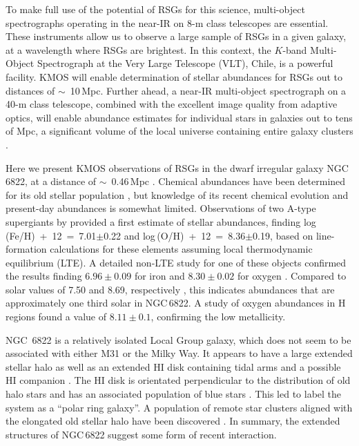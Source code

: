 To make full use of the potential of RSGs for this science, multi-object spectrographs operating in the near-IR on 8-m class telescopes are essential.
These instruments allow us to observe a large sample of RSGs in a given galaxy, at a wavelength where RSGs are brightest.
In this context, the $K$-band Multi-Object Spectrograph
\citep[KMOS;][]{2013Msngr.151...21S} at the Very Large Telescope (VLT), Chile, is a powerful facility.
KMOS will enable determination of stellar abundances for RSGs out to distances of $\sim$~10\,Mpc.
Further ahead, a near-IR multi-object spectrograph on a 40-m class telescope, combined with the excellent image quality from adaptive optics,
will enable abundance estimates for individual stars in galaxies out to tens of Mpc,
a significant volume of the local universe containing entire galaxy clusters
\citep{2011A&A...527A..50E}.

Here we present KMOS observations of RSGs in the dwarf irregular galaxy NGC\,6822,
at a distance of $\sim$~0.46\,Mpc
\citep[][and references therein]{2012AJ....144....4M}.
Chemical abundances have been determined for its old stellar population
\citep[e.g.][]{2001MNRAS.327..918T,2013ApJ...779..102K},
but knowledge of its recent chemical evolution and present-day abundances is
somewhat limited.
Observations of two A-type supergiants by
\cite{2001ApJ...547..765V} provided a first estimate of stellar abundances, finding
log\,(Fe/H)~+~12~=~7.01$\pm$0.22 and
log\,(O/H)~+~12~=~8.36$\pm$0.19, based on line-formation calculations for these elements
assuming local thermodynamic equilibrium (LTE).
A detailed non-LTE study for one of these objects confirmed the results finding
$6.96\pm 0.09$ for iron and $8.30\pm0.02$ for oxygen
\citep{2002PhDT.........3P}.
Compared to solar values of 7.50 and 8.69, respectively
\citep{2009ARA&A..47..481A},
this indicates abundances that are approximately one third solar in NGC\,6822.
A study of oxygen abundances in H\,\2 regions
\citep{2006ApJ...642..813L} found a value of $8.11\pm0.1$, confirming the low metallicity.

NGC\, 6822 is a relatively isolated Local Group galaxy, which does not seem to be associated with either M31 or the Milky Way.
It appears to have a large extended stellar halo
\citep{2002AJ....123..832L,2014ApJ...783...49H}
as well as an extended HI disk containing tidal arms and a possible HI companion
\citep{2000ApJ...537L..95D}.
The HI disk is orientated perpendicular to the distribution of old halo stars and has an associated population of blue stars
\citep{2003MNRAS.341L..39D,2003ApJ...590L..17K}.
This led \cite{2006ApJ...636L..85D} to label the system as a ``polar ring galaxy''.
A population of remote star clusters aligned with the elongated old stellar halo have been discovered
\citep{2011ApJ...738...58H,2013MNRAS.429.1039H}.
In summary, the extended structures of NGC\,6822 suggest some form of recent interaction.

